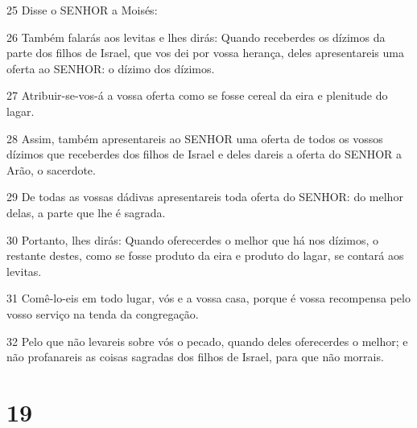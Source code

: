 \par 25 Disse o SENHOR a Moisés:
\par 26 Também falarás aos levitas e lhes dirás: Quando receberdes os dízimos da parte dos filhos de Israel, que vos dei por vossa herança, deles apresentareis uma oferta ao SENHOR: o dízimo dos dízimos.
\par 27 Atribuir-se-vos-á a vossa oferta como se fosse cereal da eira e plenitude do lagar.
\par 28 Assim, também apresentareis ao SENHOR uma oferta de todos os vossos dízimos que receberdes dos filhos de Israel e deles dareis a oferta do SENHOR a Arão, o sacerdote.
\par 29 De todas as vossas dádivas apresentareis toda oferta do SENHOR: do melhor delas, a parte que lhe é sagrada.
\par 30 Portanto, lhes dirás: Quando oferecerdes o melhor que há nos dízimos, o restante destes, como se fosse produto da eira e produto do lagar, se contará aos levitas.
\par 31 Comê-lo-eis em todo lugar, vós e a vossa casa, porque é vossa recompensa pelo vosso serviço na tenda da congregação.
\par 32 Pelo que não levareis sobre vós o pecado, quando deles oferecerdes o melhor; e não profanareis as coisas sagradas dos filhos de Israel, para que não morrais.

\chapter{19}

